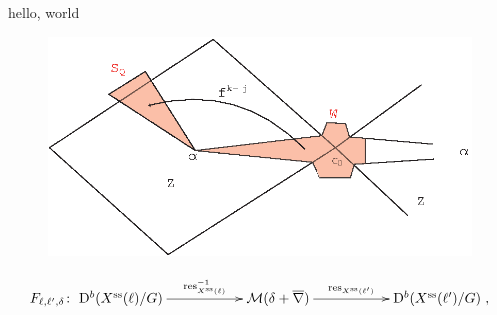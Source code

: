 \documentclass{amsart}
\begin{document}
hello, world

\begin{figure}[h]
\includegraphics{graphics-include}
\end{figure}

\[
F_{\ell, \ell', \delta} \colon \xymatrix{ \mathrm{D}^b(X^{\mathrm{ss}}(\ell) / G) \ar[rr]^-{\operatorname{res}_{X^{\mathrm{ss}}(\ell)}^{-1}} & & \mathcal{M}(\delta + \overline{\nabla}) \ar[rr]^-{\operatorname{res}_{X^{\mathrm{ss}}(\ell')}} & & \mathrm{D}^b(X^{\mathrm{ss}}(\ell')/G)},
\]
\end{document}
